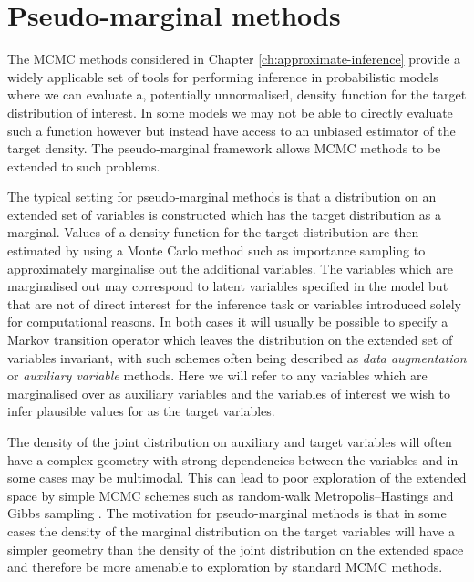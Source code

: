 \chapter{Pseudo-marginal methods}\label{ch:pseudo-marginal-methods}

The \ac{MCMC} methods considered in Chapter \ref{ch:approximate-inference} provide a widely applicable set of tools for performing inference in probabilistic models where we can evaluate a, potentially unnormalised, density function for the target distribution of interest. In some models we may not be able to directly evaluate such a function however but instead have access to an unbiased estimator of the target density. The pseudo-marginal framework \citep{andrieu2009pseudo} allows \ac{MCMC} methods to be extended to such problems.

The typical setting for pseudo-marginal methods is that a distribution on an extended set of variables is constructed which has the target distribution as a marginal. Values of a density function for the target distribution are then estimated by using a Monte Carlo method such as importance sampling to approximately marginalise out the additional variables. The variables which are marginalised out may correspond to latent variables specified in the model but that are not of direct interest for the inference task or variables introduced solely for computational reasons. In both cases it will usually be possible to specify a Markov transition operator which leaves the distribution on the extended set of variables invariant, with such schemes often being described as \emph{data augmentation} \citep{tanner1987calculation,van2001art} or \emph{auxiliary variable}  \citep{edwards1988generalization,higdon1998auxiliary} methods. Here we will refer to any variables which are marginalised over as auxiliary variables and the variables of interest we wish to infer plausible values for as the target variables.

The density of the joint distribution on auxiliary and target variables will often have a complex geometry with strong dependencies between the variables and in some cases may be multimodal. This can lead to poor exploration of the extended space by simple \ac{MCMC} schemes such as random-walk Metropolis--Hastings and Gibbs sampling \citep{andrieu2009pseudo}. The motivation for pseudo-marginal methods is that in some cases the density of the marginal distribution on the target variables will have a simpler geometry than the density of the joint distribution on the extended space and therefore be more amenable to exploration by standard \ac{MCMC} methods. 

